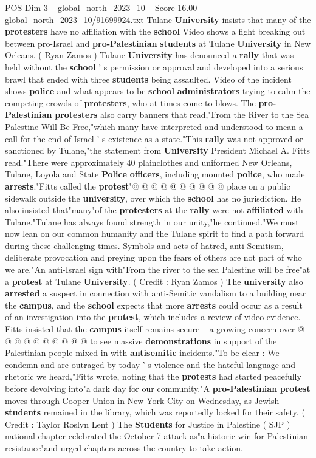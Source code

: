 \begin{textsample}{POS Dim 3 – global\_north\_2023\_10 – Score 16.00 – global\_north\_2023\_10/91699924.txt}  \label{ex:f3_pos_198}
Tulane \textbf{University} insists that many of the \textbf{protesters} have no affiliation with the \textbf{school} Video shows a fight breaking out between pro-Israel and \textbf{pro-Palestinian} \textbf{students} at Tulane \textbf{University} in New Orleans. ( Ryan Zamos ) Tulane \textbf{University} has denounced a \textbf{rally} that was held without the \textbf{school} ' s permission or approval and developed into a serious brawl that ended with three \textbf{students} being assaulted.
Video of the incident shows \textbf{police} and what appears to be \textbf{school} \textbf{administrators} trying to calm the competing crowds of \textbf{protesters}, who at times come to blows.
The \textbf{pro-Palestinian} \textbf{protesters} also carry banners that read,"From the River to the Sea Palestine Will Be Free,"which many have interpreted and understood to mean a call for the end of Israel ' s existence as a state."This \textbf{rally} was not approved or sanctioned by Tulane,"the statement from \textbf{University} President Michael A.
Fitts read."There were approximately 40 plainclothes and uniformed New Orleans, Tulane, Loyola and State \textbf{Police} \textbf{officers}, including mounted \textbf{police}, who made \textbf{arrests}."Fitts called the \textbf{protest}"@ @ @ @ @ @ @ @ @ @ place on a public sidewalk outside the \textbf{university}, over which the \textbf{school} has no jurisdiction.
He also insisted that"many"of the \textbf{protesters} at the \textbf{rally} were not \textbf{affiliated} with Tulane."Tulane has always found strength in our unity,"he continued."We must now lean on our common humanity and the Tulane spirit to find a path forward during these challenging times.
Symbols and acts of hatred, anti-Semitism, deliberate provocation and preying upon the fears of others are not part of who we are."An anti-Israel sign with"From the river to the sea Palestine will be free"at a \textbf{protest} at Tulane \textbf{University}. ( Credit : Ryan Zamos ) The \textbf{university} also \textbf{arrested} a suspect in connection with anti-Semitic vandalism to a building near the \textbf{campus}, and the \textbf{school} expects that more \textbf{arrests} could occur as a result of an investigation into the \textbf{protest}, which includes a review of video evidence.
Fitts insisted that the \textbf{campus} itself remains secure -- a growing concern over @ @ @ @ @ @ @ @ @ @ to see massive \textbf{demonstrations} in support of the Palestinian people mixed in with \textbf{antisemitic} incidents."To be clear : We condemn and are outraged by today ' s violence and the hateful language and rhetoric we heard,"Fitts wrote, noting that the \textbf{protests} had started peacefully before devolving into"a dark day for our community."A \textbf{pro-Palestinian} \textbf{protest} moves through Cooper Union in New York City on Wednesday, as Jewish \textbf{students} remained in the library, which was reportedly locked for their safety. ( Credit : Taylor Roslyn Lent ) The \textbf{Students} for Justice in Palestine ( SJP ) national chapter celebrated the October 7 attack as"a historic win for Palestinian resistance"and urged chapters across the country to take action.

\end{textsample}
